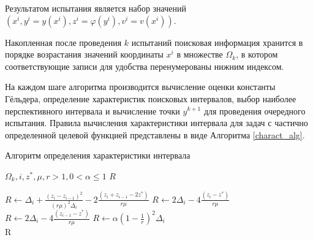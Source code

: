 \documentclass[a4paper,12pt,russian]{article}
\begin{document}
Результатом испытания является набор значений $(x^i, y^i=y(x^i), z^i = \varphi(y^i), v^i = v(x^i))$. 

Накопленная после проведения $k$ испытаний поисковая информация хранится в порядке возрастания значений координаты $x^i$ в множестве $\Omega_k$, в котором соответствующие записи для удобства перенумерованы нижним индексом.

На каждом шаге алгоритма производится вычисление оценки константы Гёльдера, определение характеристик поисковых интервалов, выбор наиболее перспективного интервала и вычисление точки $y^{k+1}$ для проведения очередного испытания.
Правила вычисления характеристики интервала для задач с частично определенной целевой функцией представлены в виде Алгоритма \ref{charact_alg}. 



\begin{algorithm}
\caption{Алгоритм определения характеристики интервала}\label{charact_alg}
\begin{algorithmic}[1]
\Require $\Omega_k, i, z^*, \mu, r >1, 0 < \alpha \leq 1$
\Ensure $R$

  
           \State $R \gets \Delta _i+\frac {{(z_i-z_{i-1})}^2}{{(r \mu)}^2 \Delta _i} - 2 \frac {(z_i+z_{i-1}-2z^*)}{r \mu}$
  
           \State $R \gets 2 \Delta _i-4 \frac {(z_i-z^*)}{r \mu}$
 
            \State $ R \gets 2 \Delta _i-4 \frac {(z_{i-1}-z^*)}{r \mu}$
\Else {}
           \State $R \gets \alpha{(1-\frac{1}{r})}^2 \Delta _i$
\EndIf\\
\Return R
\end{algorithmic}
\end{algorithm}
\end{document}
